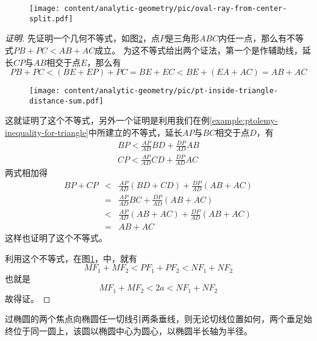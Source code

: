 \begin{figure}[htbp]
  \centering
\texttt{[image: content/analytic-geometry/pic/oval-ray-from-center-split.pdf]}
\caption{}
\label{fig:oval-ray-from-center-split}
\end{figure}

\begin{proof}[证明]
  先证明一个几何不等式，如图\ref{fig:pt-inside-triangle-distance-sum}，点$P$是三角形$ABC$内任一点，那么有不等式$PB+PC<AB+AC$成立。
  为这不等式给出两个证法，第一个是作辅助线，延长$CP$与$AB$相交于点$E$，那么有
  \begin{equation*}
    PB+PC < (BE + EP) + PC = BE + EC < BE + (EA + AC) = AB + AC
  \end{equation*}

\begin{figure}[htbp]
  \centering
\texttt{[image: content/analytic-geometry/pic/pt-inside-triangle-distance-sum.pdf]}
\caption{}
\label{fig:pt-inside-triangle-distance-sum}
\end{figure}

这就证明了这个不等式，另外一个证明是利用我们在例\ref{example:ptolemy-inequality-for-triangle}中所建立的不等式，延长$AP$与$BC$相交于点$D$，有
\begin{eqnarray*}
  BP < \frac{AP}{AD} BD + \frac{DP}{AD} AB \\
  CP < \frac{AP}{AD} CD + \frac{DP}{AD} AC 
\end{eqnarray*}
两式相加得
\begin{eqnarray*}
  BP + CP & < & \frac{AP}{AD} (BD+CD) + \frac{DP}{AD} (AB+AC) \\
  & = & \frac{AP}{AD} BC + \frac{DP}{AD} (AB+AC) \\
  & < & \frac{AP}{AD} (AB+AC) + \frac{DP}{AD} (AB+AC) \\
  & = & AB+AC
\end{eqnarray*}
这样也证明了这个不等式。

利用这个不等式，在图\ref{fig:oval-ray-from-center-split}，中，就有
\begin{equation*}
  MF_1 + MF_2 < PF_1 + PF_2 < NF_1 + NF_2
\end{equation*}
  也就是
  \begin{equation*}
    MF_1 + MF_2 < 2a < NF_1 + NF_2
  \end{equation*}
  故得证。
\end{proof}

\begin{property}
 过椭圆的两个焦点向椭圆任一切线引两条垂线，则无论切线位置如何，两个垂足始终位于同一圆上，该圆以椭圆中心为圆心，以椭圆半长轴为半径。 
\end{property}

